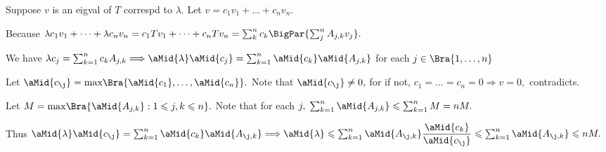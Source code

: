 \par\quad
Suppose $v$ is an eigval of $T$ correspd to $\lambda.$ Let $v=c_1v_1+\dots+c_nv_n.$\vspace{2pt}\par\quad
Because $\lambda c_1v_1+\dots+\lambda c_nv_n=c_1Tv_1+\dots+c_nTv_n=\sum_{k}^nc_k\BigPar{\sum_{j}^n A_{j,k}v_j}.$\vspace{3pt}\par\quad
We have $\lambda c_j=\sum_{k=1}^n c_kA_{j,k}\Longrightarrow\aMid{\lambda}\aMid{c_j}=\sum_{k=1}^n\aMid{c_k}\aMid{A_{j,k}}$ for each $j\in\Bra{1,\dots,n}$\vspace{4pt}\par\quad
Let $\aMid{c_{\j}}=\max\!\Bra{\aMid{c_1},\dots,\aMid{c_n}}.$ Note that $\aMid{c_{\j}}\neq 0,$ for if not, $c_1=\dots=c_n=0\Rightarrow v=0,$ contradicts.\vspace{6pt}\par\quad
Let $M=\max\!\Bra{\aMid{A_{j,k}}:1\leqslant j,k\leqslant n}.$ Note that for each $j,\;\sum_{k=1}^n\aMid{A_{j,k}}\leqslant\sum_{k=1}^nM=nM.$\vspace{4pt}\par\quad
Thus $\aMid{\lambda}\aMid{c_{\j}}=\sum_{k=1}^n\aMid{c_k}\aMid{A_{{\j},k}}\Longrightarrow\aMid{\lambda}\leqslant\sum_{k=1}^n\aMid{A_{{\j},k}}\displaystyle\frac{\aMid{c_k}}{\aMid{c_{\j}}}\textstyle\leqslant\sum_{k=1}^n\aMid{A_{{\j},k}}\leqslant nM.$\PfEnd\vspace{2pt}
\SepLine\pagebreak

